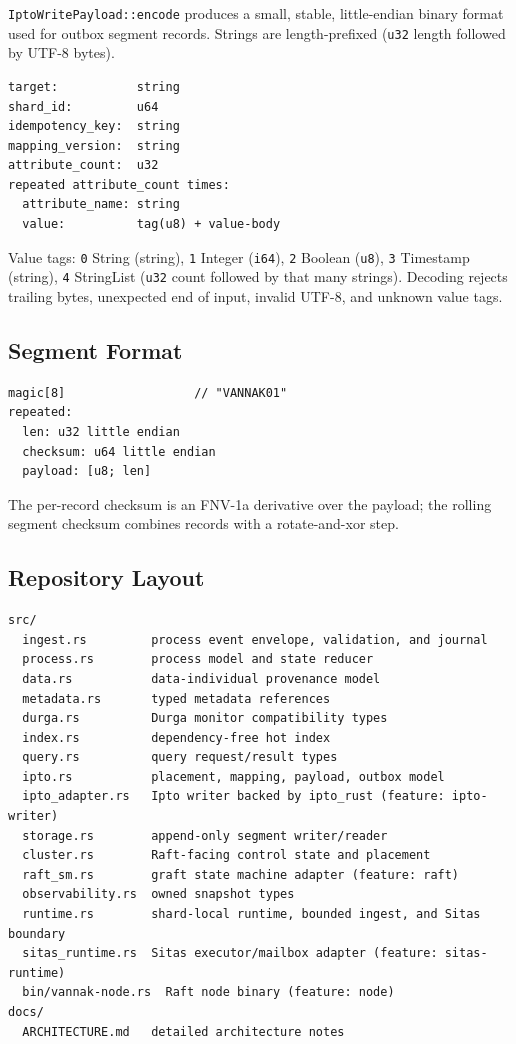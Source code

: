 \texttt{IptoWritePayload::encode} produces a small, stable, little-endian binary
format used for outbox segment records. Strings are length-prefixed
(\texttt{u32} length followed by UTF-8 bytes).

\begin{lstlisting}[numbers=none]
target:           string
shard_id:         u64
idempotency_key:  string
mapping_version:  string
attribute_count:  u32
repeated attribute_count times:
  attribute_name: string
  value:          tag(u8) + value-body
\end{lstlisting}

Value tags: \texttt{0} String (string), \texttt{1} Integer (\texttt{i64}),
\texttt{2} Boolean (\texttt{u8}), \texttt{3} Timestamp (string), \texttt{4}
StringList (\texttt{u32} count followed by that many strings). Decoding rejects
trailing bytes, unexpected end of input, invalid UTF-8, and unknown value tags.

\subsection{Segment Format}

\begin{lstlisting}[numbers=none]
magic[8]                  // "VANNAK01"
repeated:
  len: u32 little endian
  checksum: u64 little endian
  payload: [u8; len]
\end{lstlisting}

The per-record checksum is an FNV-1a derivative over the payload; the rolling
segment checksum combines records with a rotate-and-xor step.

\subsection{Repository Layout}

\begin{lstlisting}[numbers=none]
src/
  ingest.rs         process event envelope, validation, and journal
  process.rs        process model and state reducer
  data.rs           data-individual provenance model
  metadata.rs       typed metadata references
  durga.rs          Durga monitor compatibility types
  index.rs          dependency-free hot index
  query.rs          query request/result types
  ipto.rs           placement, mapping, payload, outbox model
  ipto_adapter.rs   Ipto writer backed by ipto_rust (feature: ipto-writer)
  storage.rs        append-only segment writer/reader
  cluster.rs        Raft-facing control state and placement
  raft_sm.rs        graft state machine adapter (feature: raft)
  observability.rs  owned snapshot types
  runtime.rs        shard-local runtime, bounded ingest, and Sitas boundary
  sitas_runtime.rs  Sitas executor/mailbox adapter (feature: sitas-runtime)
  bin/vannak-node.rs  Raft node binary (feature: node)
docs/
  ARCHITECTURE.md   detailed architecture notes
\end{lstlisting}

